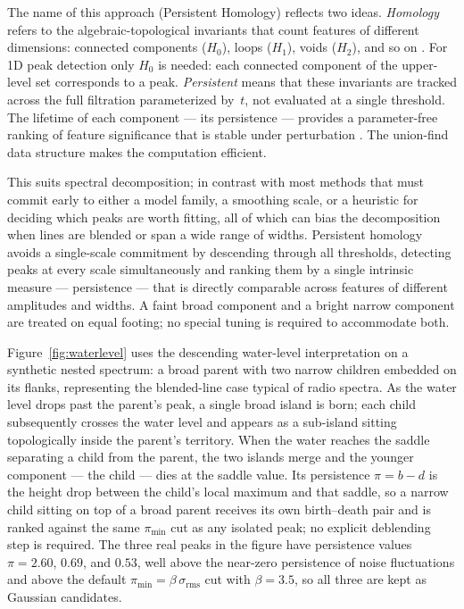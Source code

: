 \documentclass[twocolumn,twocolappendix,aj]{aastex631}
\newcommand{\srms}{\sigma_{\mathrm{rms}}}
\newcommand{\pmin}{\pi_{\mathrm{min}}}
\begin{document}
The name of this approach (Persistent Homology) reflects two ideas.  \emph{Homology} refers to the
algebraic-topological invariants that count features of different
dimensions: connected components ($H_0$), loops ($H_1$), voids ($H_2$),
and so on \citep{Zomorodian2005}.  For 1D peak detection only $H_0$ is
needed: each connected component of the upper-level set corresponds to a
peak.  \emph{Persistent} means that these invariants are tracked across the
full filtration parameterized by~$t$, not evaluated at a single threshold.
The lifetime of each component --- its persistence --- provides a
parameter-free ranking of feature significance that is stable under
perturbation \citep{Edelsbrunner2002,Otter2017}.  The union-find data
structure \citep{Tarjan1975} makes the computation efficient.

This suits spectral decomposition; in contrast with most methods that must commit early to
either a model family, a smoothing scale, or a heuristic for deciding which
peaks are worth fitting, all of which can bias the decomposition when lines
are blended or span a wide range of widths.  Persistent homology avoids a
single-scale commitment by descending through all thresholds, detecting peaks
at every scale simultaneously and ranking them by a single intrinsic measure
--- persistence --- that is directly comparable across features of different
amplitudes and widths.  A faint broad component and a bright narrow component
are treated on equal footing; no special tuning is required to accommodate
both.

Figure~\ref{fig:waterlevel} uses the descending water-level interpretation
on a synthetic nested spectrum: a broad parent with two narrow children
embedded on its flanks, representing the blended-line case typical of radio
spectra.  As the water level drops past the parent's peak, a single broad
island is born; each child subsequently crosses the water level and appears
as a sub-island sitting topologically inside the parent's territory.  When
the water reaches the saddle separating a child from the parent, the two
islands merge and the younger component --- the child --- dies at the
saddle value.  Its persistence $\pi = b - d$ is the height drop between the
child's local maximum and that saddle, so a narrow child sitting on top of
a broad parent receives its own birth--death pair and is ranked against the
same $\pmin$ cut as any isolated peak; no explicit deblending step is
required.  The three real peaks in the figure have persistence values
$\pi = 2.60$, $0.69$, and $0.53$, well above the near-zero persistence of
noise fluctuations and above the default $\pmin = \beta\,\srms$ cut with
$\beta = 3.5$, so all three are kept as Gaussian candidates.
\end{document}

